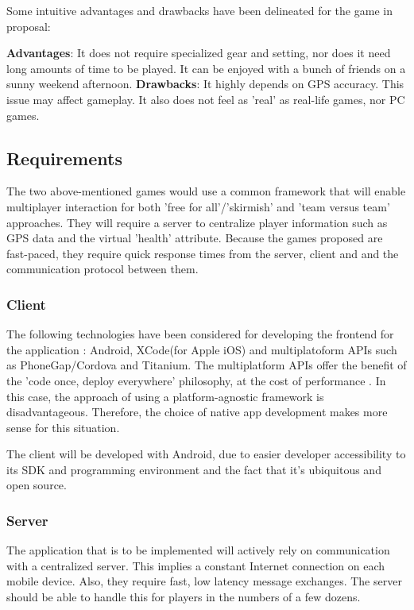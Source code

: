 \documentclass{article}
\begin{document}
Some intuitive advantages and drawbacks have been delineated for the game in
proposal:\newline

\textbf{Advantages}: It does not require specialized gear and setting, nor does
it need long amounts of time to be played. It can be enjoyed with a bunch of
friends on a sunny weekend afternoon.\newline
\textbf{Drawbacks}: It highly depends on GPS accuracy. This issue may affect
gameplay. It also does not feel as 'real' as real-life games, nor PC
games.\newline


\subsection{Requirements}

The two above-mentioned games would use a common framework that will enable
multiplayer interaction for both 'free for all'/'skirmish' and 'team versus team'
approaches. They will require a server to centralize player information such as
GPS data and the virtual 'health' attribute. Because the games proposed are
fast-paced, they require quick response times from the server, client and and
the communication protocol between them.

\subsubsection{Client}
The following technologies have been considered for developing the frontend for
the application : Android, XCode(for Apple iOS) and multiplatoform APIs such as
PhoneGap/Cordova and Titanium. The multiplatform APIs offer the benefit of
the 'code once, deploy everywhere' philosophy, at the cost of performance
\cite{nativevscrossplatform}\cite{nativevscrossplatform2}\cite{nativevscrossplatform3}.
In this case, the approach of using a platform-agnostic framework is
disadvantageous. Therefore, the choice of native app development makes more
sense for this situation.\newline

The client will be developed with Android, due to easier developer
accessibility to its SDK and programming environment and the fact that it's
ubiquitous and open source.\newline

\subsubsection{Server}
The application that is to be implemented will actively rely on communication
with a centralized server. This implies a constant Internet connection on each
mobile device. Also, they require fast, low latency message exchanges. The
server should be able to handle this for players in the numbers of a few
dozens.\newline
\end{document}
